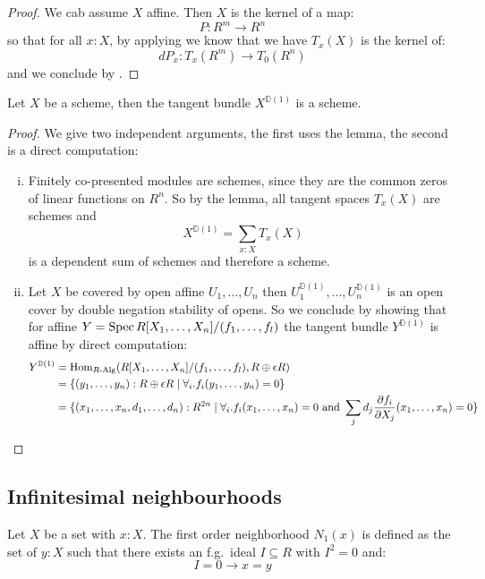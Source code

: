 \begin{proof}
We cab assume $X$ affine. Then $X$ is the kernel of a map:
\[P:R^m\to R^n\]
so that for all $x:X$, by applying  we know that we have $T_x(X)$ is the kernel of:
\[dP_x : T_x(R^m)\to T_0(R^n)\]
and we conclude by .
\end{proof}

\begin{corollary}
  \label{tangent-bundle-scheme}
  Let $X$ be a scheme, then the tangent bundle $X^{\mathbb{D}(1)}$ is a scheme.
\end{corollary}

\begin{proof}
  We give two independent arguments, the first uses the lemma, the second is a direct computation:
  \begin{enumerate}[(i)]
  \item Finitely co-presented modules are schemes, since they are the common zeros of linear functions on $R^n$.
    So by the lemma, all tangent spaces $T_x(X)$ are schemes and
    \[
      X^{\mathbb{D}(1)}=\sum_{x:X}T_x(X)
    \]
    is a dependent sum of schemes and therefore a scheme.
  \item Let $X$ be covered by open affine $U_1,\dots,U_n$ then $U_1^{\mathbb{D}(1)},\dots,U_n^{\mathbb{D}(1)}$ is an open cover by double negation stability of opens.
    So we conclude by showing that for affine $Y=\operatorname{Spec} R[X_1,\dots,X_n]/(f_1,\dots,f_l)$ the tangent bundle $Y^{\mathbb{D}(1)}$ is affine
    by direct computation:
    \begin{align*}
      Y^{\mathbb{D}(1)}&=\mathrm{Hom}_{R\text{-}\mathrm{Alg}}(R[X_1,\dots,X_n]/(f_1,\dots,f_l), R\oplus \epsilon R) \\
                       &= \{(y_1,\dots,y_n):R\oplus \epsilon R \mid \forall_i. f_i(y_1,\dots,y_n)=0\} \\
                       &= \{(x_1,\dots,x_n,d_1,\dots,d_n):R^{2n} \mid \forall_i. f_i(x_1,\dots,x_n)=0\text{ and } \sum_j d_j\frac{\partial f_i}{\partial X_j}(x_1,\dots,x_n) =0\} 
    \end{align*}
  \end{enumerate}
\end{proof}

\subsection{Infinitesimal neighbourhoods}

\begin{definition}
Let $X$ be a set with $x:X$. The first order neighborhood $N_1(x)$ is defined as the set of $y:X$ such that there exists an f.g.\ ideal $I\subseteq R$ with $I^{2}=0$ and:
\[I=0 \to x=y\]
\end{definition}

